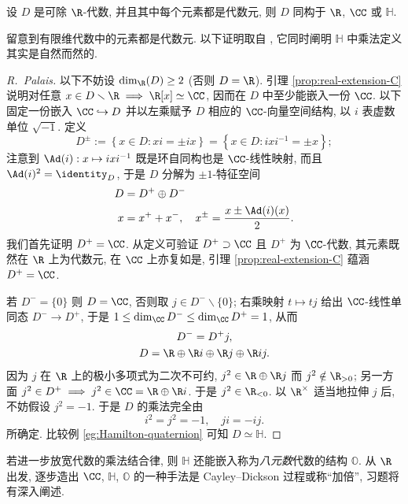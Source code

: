 \begin{theorem}[F.\ G.\ Frobenius, 1877]\label{prop:division-R-algebra}
	设 $D$ 是可除 $\R$-代数, 并且其中每个元素都是代数元, 则 $D$ 同构于 $\R$, $\CC$ 或 $\mathbb{H}$.
\end{theorem}
留意到有限维代数中的元素都是代数元. 以下证明取自 \cite[(13.12)]{Lam01}, 它同时阐明 $\mathbb{H}$ 中乘法定义其实是自然而然的.
\begin{proof}[R.\ Palais]
	以下不妨设 $\dim_{\R}(D) \geq 2$ (否则 $D=\R$). 引理 \ref{prop:real-extension-C} 说明对任意 $x \in D \smallsetminus \R \implies \R[x] \simeq \CC$, 因而在 $D$ 中至少能嵌入一份 $\CC$. 以下固定一份嵌入 $\CC \hookrightarrow D$ 并以左乘赋予 $D$ 相应的 $\CC$-向量空间结构, 以 $i$ 表虚数单位 $\sqrt{-1}$. 定义
	\[ D^\pm := \left\{ x \in D : xi = \pm ix \right\} = \left\{ x \in D: ixi^{-1} = \pm x \right\}; \]
	注意到 $\Ad(i): x \mapsto ixi^{-1}$ 既是环自同构也是 $\CC$-线性映射, 而且 $\Ad(i)^2 = \identity_D$, 于是 $D$ 分解为 $\pm 1$-特征空间
	\begin{align*}
		D & = D^+ \oplus D^- \\
		x & = x^+ + x^-, \quad x^\pm = \frac{x \pm \Ad(i)(x)}{2}.
	\end{align*}
	我们首先证明 $D^+ = \CC$. 从定义可验证 $D^+ \supset \CC$ 且 $D^+$ 为 $\CC$-代数, 其元素既然在 $\R$ 上为代数元, 在 $\CC$ 上亦复如是, 引理 \ref{prop:real-extension-C} 蕴涵 $D^+ = \CC$.

	若 $D^- = \{0\}$ 则 $D = \CC$, 否则取 $j \in D^- \smallsetminus \{0\}$; 右乘映射 $t \mapsto tj$ 给出 $\CC$-线性单同态 $D^- \to D^+$, 于是 $1 \leq \dim_{\CC} D^- \leq \dim_{\CC} D^+ = 1$, 从而
	\begin{gather*}
		D^- = D^+ j, \\
		D = \R \oplus \R i \oplus \R j \oplus \R ij.
	\end{gather*}
	因为 $j$ 在 $\R$ 上的极小多项式为二次不可约, $j^2 \in \R \oplus \R j$ 而 $j^2 \notin \R_{>0}$; 另一方面 $j^2 \in D^+ \implies j^2 \in \CC = \R \oplus \R i$. 于是 $j^2 \in \R_{<0}$. 以 $\R^\times$ 适当地拉伸 $j$ 后, 不妨假设 $j^2 = -1$. 于是 $D$ 的乘法完全由
	\[ i^2 = j^2 = -1, \quad ji=-ij. \]
	所确定. 比较例 \ref{eg:Hamilton-quaternion} 可知 $D \simeq \mathbb{H}$.
\end{proof}
若进一步放宽代数的乘法结合律, 则 $\mathbb{H}$ 还能嵌入称为\emph{八元数}代数的结构 $\mathbb{O}$. 从 $\R$ 出发, 逐步造出 $\CC$, $\mathbb{H}$, $\mathbb{O}$ 的一种手法是 Cayley--Dickson 过程或称``加倍'', 习题将有深入阐述. 


